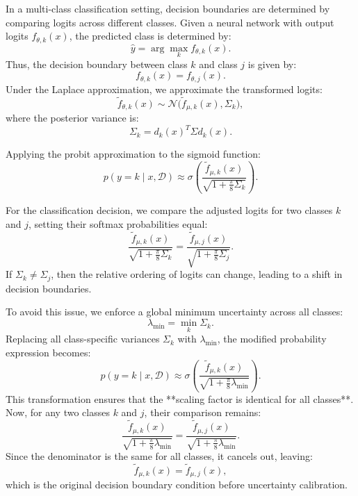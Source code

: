\documentclass{article}
\begin{document}
In a multi-class classification setting, decision boundaries are determined by comparing logits across different classes. Given a neural network with output logits \( f_{\theta, k}(x) \), the predicted class is determined by:
\begin{equation}
    \hat{y} = \arg\max_{k} f_{\theta, k}(x).
\end{equation}
Thus, the decision boundary between class \( k \) and class \( j \) is given by:
\begin{equation}
    f_{\theta, k}(x) = f_{\theta, j}(x).
\end{equation}
Under the Laplace approximation, we approximate the transformed logits:
\begin{equation}
    \tilde{f}_{\theta,k}(x) \sim \mathcal{N}\bigl(\tilde{f}_{\mu,k}(x), \Sigma_k\bigr),
\end{equation}
where the posterior variance is:
\begin{equation}
    \Sigma_k = d_k(x)^T \Sigma d_k(x).
\end{equation}

Applying the probit approximation to the sigmoid function:
\begin{equation}
    p(y = k \mid x, \mathcal{D}) \approx \sigma\!\left( \frac{\tilde{f}_{\mu,k}(x)}{\sqrt{1+\frac{\pi}{8} \Sigma_k}} \right).
\end{equation}

For the classification decision, we compare the adjusted logits for two classes \( k \) and \( j \), setting their softmax probabilities equal:
\begin{equation}
    \frac{\tilde{f}_{\mu,k}(x)}{\sqrt{1+\frac{\pi}{8} \Sigma_k}} = \frac{\tilde{f}_{\mu,j}(x)}{\sqrt{1+\frac{\pi}{8} \Sigma_j}}.
\end{equation}
If \( \Sigma_k \neq \Sigma_j \), then the relative ordering of logits can change, leading to a shift in decision boundaries.

To avoid this issue, we enforce a global minimum uncertainty across all classes:
\begin{equation}
    \lambda_{\min} = \min_{k} \Sigma_k.
\end{equation}
Replacing all class-specific variances \( \Sigma_k \) with \( \lambda_{\min} \), the modified probability expression becomes:
\begin{equation}
    p(y = k \mid x, \mathcal{D}) \approx \sigma\!\left( \frac{\tilde{f}_{\mu,k}(x)}{\sqrt{1+\frac{\pi}{8} \lambda_{\min}}} \right).
\end{equation}
This transformation ensures that the **scaling factor is identical for all classes**. Now, for any two classes \( k \) and \( j \), their comparison remains:
\begin{equation}
    \frac{\tilde{f}_{\mu,k}(x)}{\sqrt{1+\frac{\pi}{8} \lambda_{\min}}} = \frac{\tilde{f}_{\mu,j}(x)}{\sqrt{1+\frac{\pi}{8} \lambda_{\min}}}.
\end{equation}
Since the denominator is the same for all classes, it cancels out, leaving:
\begin{equation}
    \tilde{f}_{\mu,k}(x) = \tilde{f}_{\mu,j}(x),
\end{equation}
which is the original decision boundary condition before uncertainty calibration.
\end{document}
